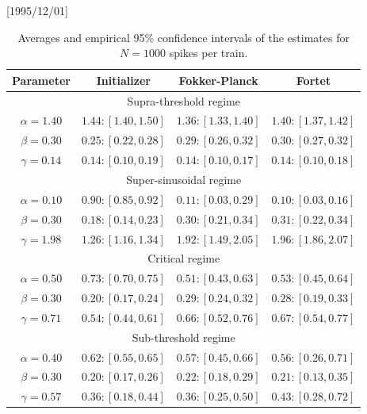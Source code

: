 \NeedsTeXFormat{LaTeX2e}[1995/12/01] \documentclass[10pt]{bmc_article}
\newenvironment{bmcformat}{\begin{raggedright}\baselineskip20pt\sloppy\setboolean{publ}{false}}{\end{raggedright}\baselineskip20pt\sloppy}
\begin{document}
\begin{bmcformat}
\begin{table}
\begin{center}
{\begin{tabular}{|c|ccc|} 
Parameter
& Initializer
& Fokker-Planck
& Fortet
\\ \hline
\multicolumn{4}{|c|}{Supra-threshold regime} \\[1mm]
$\alpha=1.40$
& $1.44 : [1.40, 1.50]$
& $1.36 : [1.33, 1.40]$
& $1.40 : [1.37, 1.42]$
\\
$\beta=0.30$
& $0.25 : [0.22, 0.28]$
& $0.29 : [0.26, 0.32]$
& $0.30 : [0.27, 0.32]$
\\
$\gamma=0.14$
& $0.14 : [0.10, 0.19]$
& $0.14 : [0.10, 0.17]$
& $0.14 : [0.10, 0.18]$
\\
\hline \hline
\multicolumn{4}{|c|}{Super-sinusoidal regime} \\[1mm]
$\alpha=0.10$
& $0.90 : [0.85, 0.92]$
& $0.11 : [0.03, 0.29]$
& $0.10 : [0.03, 0.16]$
\\
$\beta=0.30$
& $0.18 : [0.14, 0.23]$
& $0.30 : [0.21, 0.34]$
& $0.31 : [0.22, 0.34]$
\\
$\gamma=1.98$
& $1.26 : [1.16, 1.34]$
& $1.92 : [1.49, 2.05]$
& $1.96 : [1.86, 2.07]$
\\
\hline \hline
\multicolumn{4}{|c|}{Critical regime} \\[1mm]
$\alpha=0.50$
& $0.73 : [0.70, 0.75]$
& $0.51 : [0.43, 0.63]$
& $0.53 : [0.45, 0.64]$
\\
$\beta=0.30$
& $0.20 : [0.17, 0.24]$
& $0.29 : [0.24, 0.32]$
& $0.28 : [0.19, 0.33]$
\\
$\gamma=0.71$
& $0.54 : [0.44, 0.61]$
& $0.66 : [0.52, 0.76]$
& $0.67 : [0.54, 0.77]$
\\
\hline \hline
\multicolumn{4}{|c|}{Sub-threshold regime} \\[1mm]
$\alpha=0.40$
& $0.62 : [0.55, 0.65]$
& $0.57 : [0.45, 0.66]$
& $0.56 : [0.26, 0.71]$
\\
$\beta=0.30$
& $0.20 : [0.17, 0.26]$
& $0.22 : [0.18, 0.29]$
& $0.21 : [0.13, 0.35]$
\\
$\gamma=0.57$
& $0.36 : [0.18, 0.44]$
& $0.36 : [0.25, 0.50]$
& $0.43 : [0.28, 0.72]$
\\
\hline
 \end{tabular}}\\
\end{center}
\caption{Averages and empirical 95\% confidence intervals of the estimates for $N=1000$
spikes per train. }
\label{tab:est_quantiles_1000}
\end{table}
\begin{table}


\end{table}
\end{bmcformat}
\end{document}
